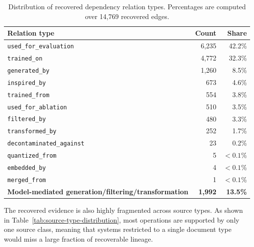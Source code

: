 \begin{table}[t]
\centering
\small
\caption{Distribution of recovered dependency relation types. Percentages are computed over 14,769 recovered edges. }
\label{tab:relation-types}
\begin{tabular}{lrr}
\toprule
Relation type & Count & Share \\
\midrule
\texttt{used\_for\_evaluation} & 6,235 & 42.2\% \\
\texttt{trained\_on} & 4,772 & 32.3\% \\
\texttt{generated\_by} & 1,260 & 8.5\% \\
\texttt{inspired\_by} & 673 & 4.6\% \\
\texttt{trained\_from} & 554 & 3.8\% \\
\texttt{used\_for\_ablation} & 510 & 3.5\% \\
\texttt{filtered\_by} & 480 & 3.3\% \\
\texttt{transformed\_by} & 252 & 1.7\% \\
\texttt{decontaminated\_against} & 23 & 0.2\% \\
\texttt{quantized\_from} & 5 & $<0.1$\% \\
\texttt{embedded\_by} & 4 & $<0.1$\% \\
\texttt{merged\_from} & 1 & $<0.1$\% \\
\midrule
\textbf{Model-mediated generation/filtering/transformation} & \textbf{1,992} & \textbf{13.5\%} \\
\bottomrule
\end{tabular}
\end{table}

The recovered evidence is also highly fragmented across source types. As shown in Table~\ref{tab:source-type-distribution}, most operations are supported by only one source class, meaning that systems restricted to a single document type would miss a large fraction of recoverable lineage.

